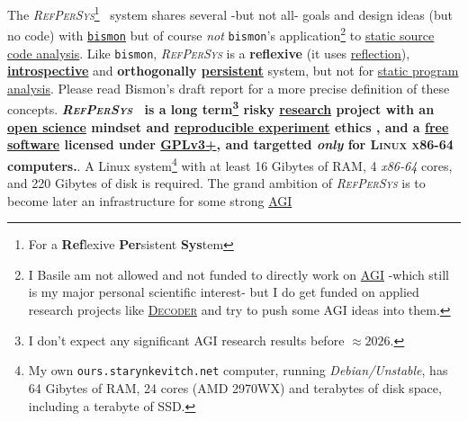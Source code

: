 \documentclass[11pt,a4paper,svgnames]{article}
\newcommand{\RefPerSys}{{\textit{\textsc{RefPerSys}}}}
\begin{document}
The \RefPerSys\footnote{For a \textbf{Ref}lexive \textbf{Per}sistent
  \textbf{Sys}tem}~ system shares several -but not all- goals and
design ideas (but no code) with
\href{http://github.com/bstarynk/bismon}{\texttt{bismon}}
\cite{Starynkevitch:2019:bismon-draft} but of course \emph{not}
\texttt{bismon}'s application\footnote{I Basile am not allowed and not
funded to directly work on
\href{https://en.wikipedia.org/wiki/Artificial_general_intelligence}{AGI}
-which still is my major personal scientific interest- but I do get
funded on applied research projects like
\href{https://www.decoder-project.eu/}{\textsc{Decoder}} and try to
push some AGI ideas into them.} to
\href{https://en.wikipedia.org/wiki/Static_program_analysis}{static
  source code analysis}. Like \texttt{bismon}, {\RefPerSys} is a
\textbf{reflexive} (it uses
\href{https://en.wikipedia.org/wiki/Reflection_(computer_programming)}{reflection}),
\textbf{\href{https://en.wikipedia.org/wiki/Virtual\_machine\_introspection}{introspective}}
and \textbf{orthogonally
  \href{https://en.wikipedia.org/wiki/Persistence_(computer_science)}{persistent}}
system, but not for
\href{https://en.wikipedia.org/wiki/Static_program_analysis}{static
  program analysis}. Please read Bismon's draft report
\cite{Starynkevitch:2019:bismon-draft} for a more precise definition
of these concepts. \textbf{\RefPerSys~ is a long term\footnote{I don't
    expect any significant AGI research results before $\approx
    2026$.}  risky
  \href{https://en.wikipedia.org/wiki/Research}{research} project with
  an \href{https://en.wikipedia.org/wiki/Open_science}{open science}
  mindset and
  \href{https://ropensci.github.io/reproducibility-guide/sections/introduction/}{reproducible
    experiment} ethics \cite{zuboff:2015:big-other,
    oneil:2016:weapons}, and a
  \href{https://www.gnu.org/philosophy/free-sw.en.html}{free software}
  licensed under
  \href{https://www.gnu.org/licenses/gpl-3.0.html}{GPLv3+}, and
  targetted \emph{only} for \textsc{Linux x86-64} computers.}. A Linux
system\footnote{My own \texttt{ours.starynkevitch.net} computer,
  running \textit{Debian/Unstable}, has 64 Gibytes of RAM, 24 cores
  (AMD 2970WX) and terabytes of disk space, including a terabyte of
  SSD.}  with at least 16 Gibytes of RAM, 4 \textit{x86-64} cores, and
220 Gibytes of disk is required. The grand ambition of {\RefPerSys} is
to become later an infrastructure for some strong
\href{https://en.wikipedia.org/wiki/Artificial_general_intelligence}{AGI}
\end{document}
